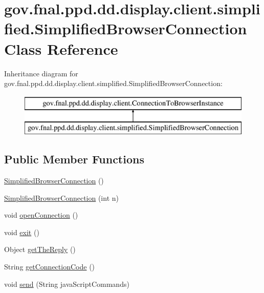 \hypertarget{classgov_1_1fnal_1_1ppd_1_1dd_1_1display_1_1client_1_1simplified_1_1SimplifiedBrowserConnection}{\section{gov.\-fnal.\-ppd.\-dd.\-display.\-client.\-simplified.\-Simplified\-Browser\-Connection Class Reference}
\label{classgov_1_1fnal_1_1ppd_1_1dd_1_1display_1_1client_1_1simplified_1_1SimplifiedBrowserConnection}
}
Inheritance diagram for gov.\-fnal.\-ppd.\-dd.\-display.\-client.\-simplified.\-Simplified\-Browser\-Connection\-:\begin{figure}[H]
\begin{center}
\leavevmode
\includegraphics[height=2.000000cm]{classgov_1_1fnal_1_1ppd_1_1dd_1_1display_1_1client_1_1simplified_1_1SimplifiedBrowserConnection}
\end{center}
\end{figure}
\subsection*{Public Member Functions}
\begin{DoxyCompactItemize}
\item 
\hyperlink{classgov_1_1fnal_1_1ppd_1_1dd_1_1display_1_1client_1_1simplified_1_1SimplifiedBrowserConnection_a05f74fd4120d43266b0a8df9380834ee}{Simplified\-Browser\-Connection} ()
\item 
\hyperlink{classgov_1_1fnal_1_1ppd_1_1dd_1_1display_1_1client_1_1simplified_1_1SimplifiedBrowserConnection_a2116702cb839ef21aadd8b9f0bf638bd}{Simplified\-Browser\-Connection} (int n)
\item 
void \hyperlink{classgov_1_1fnal_1_1ppd_1_1dd_1_1display_1_1client_1_1simplified_1_1SimplifiedBrowserConnection_a37db2f6ae47eadc8e2a7c4152419f192}{open\-Connection} ()
\item 
void \hyperlink{classgov_1_1fnal_1_1ppd_1_1dd_1_1display_1_1client_1_1simplified_1_1SimplifiedBrowserConnection_abe5088032d49f2f6165f1323393bfc02}{exit} ()
\item 
Object \hyperlink{classgov_1_1fnal_1_1ppd_1_1dd_1_1display_1_1client_1_1simplified_1_1SimplifiedBrowserConnection_a855befa96ca62c59bfa892d2e3ab02a5}{get\-The\-Reply} ()
\item 
String \hyperlink{classgov_1_1fnal_1_1ppd_1_1dd_1_1display_1_1client_1_1simplified_1_1SimplifiedBrowserConnection_ad79f1d9224980458f61ab2fae978e622}{get\-Connection\-Code} ()
\item 
void \hyperlink{classgov_1_1fnal_1_1ppd_1_1dd_1_1display_1_1client_1_1simplified_1_1SimplifiedBrowserConnection_aa44d70781099fdc3cbe2266e55523c29}{send} (String java\-Script\-Commands)
\end{DoxyCompactItemize}
